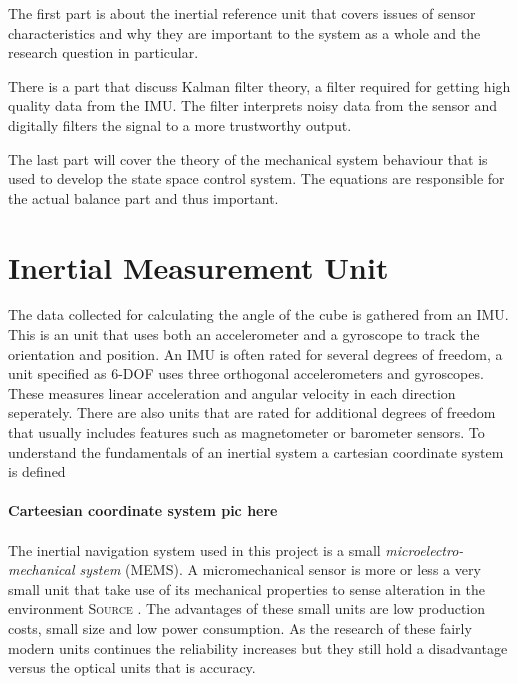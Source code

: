 \documentclass[a4paper,11pt]{kth-mag}
\begin{document}
The first part is about the inertial reference unit that covers issues of sensor characteristics and why they are important to the system as a whole and the research question in particular.

There is a part that discuss Kalman filter theory, a filter required for getting high quality data from the IMU. The filter interprets noisy data from the sensor and digitally filters the signal to a more trustworthy output. 

The last part will cover the theory of the mechanical system behaviour that is used to develop the state space control system. The equations are responsible for the actual balance part and thus important. 



\section{Inertial Measurement Unit}
The data collected for calculating the angle of the cube is gathered from an IMU. This is an unit that uses both an accelerometer and a gyroscope to track the orientation and position. An IMU is often rated for several degrees of freedom, a unit specified as 6-DOF uses three orthogonal accelerometers and gyroscopes. These measures linear acceleration and angular velocity in each direction seperately. There are also units that are rated for additional degrees of freedom that usually includes features such as magnetometer or barometer sensors.   
To understand the fundamentals of an inertial system a cartesian coordinate system is defined
\\ \\
\textbf{Carteesian coordinate system pic here}
\\ \\

The inertial navigation system used in this project is a small \textit{microelectro-mechanical system} (MEMS). A micromechanical sensor is more or less a very small unit that take use of its mechanical properties to sense alteration in the environment \textsc{Source} . The advantages of these small units are low production costs, small size and low power consumption. As the research of these fairly modern units continues the reliability increases but they still hold a disadvantage versus the optical units that is accuracy. \cite{IMUintro}
\end{document}
